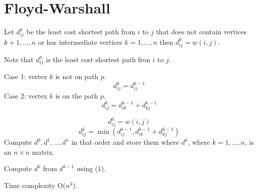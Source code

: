\documentclass[12pt,twoside,letterpaper]{article}
\begin{document}
\section*{Floyd-Warshall}
Let $d_{ij}^k$ be the least cost shortest path from $i$ to $j$ that does not contain vertices $k+1,...,n$ or has intermediate vertices $k=1,...,n$ then $d_{ij}^0=w(i,j)$.

Note that $d_{ij}^n$ is the least cost shortest path fron $i$ to $j$.

Case 1: vertex $k$ is not on path $p$.
$$d_{ij}^k=d_{ij}^{k-1}$$
Case 2: vertex $k$ is on the path $p$.
$$d_{ij}^k=d_{ik}^{k-1}+d_{kj}^{k-1}$$

$$d_{ij}^0=w(i,j)$$
\begin{equation}
d_{ij}^k=\min\left( d_{ij}^{k-1}, d_{ik}^{k-1}+d_{kj}^{k-1}\right)
\end{equation}
Compute $d^0,d^1,...,d^n$ in that order and store them where $d^k$, where $k=1,...,n$, is an $n \times n$ matrix.

Compute $d^k$ from $d^{k-1}$ using (1).

Time complexity O($n^3$).
\end{document}
